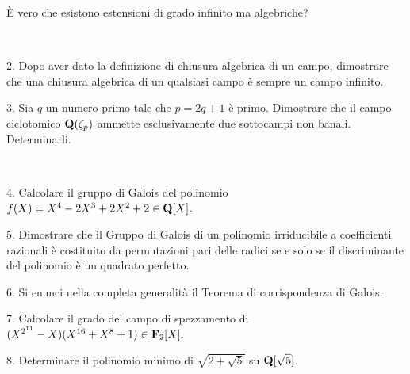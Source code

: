  \`E vero che esistono estensioni di grado infinito ma algebriche?\medskip\bigskip\bigskip

\ \dotfill\ \bigskip\bigskip\bigskip


\vfil\eject


\item{2.} Dopo aver dato la definizione di chiusura algebrica di un campo, dimostrare che una chiusura 
algebrica di un qualsiasi campo \`e sempre un campo infinito.

\vv


\item{3.} Sia $q$ un numero primo tale che $p=2q+1$ \`e  primo. Dimostrare che il campo ciclotomico
${\bf Q}(\zeta_p)$ ammette esclusivamente due sottocampi non banali. Determinarli.

\ve\ \vs


\item{4.} Calcolare il gruppo di Galois del polinomio $f(X)=X^4-2X^3+2X^2+2 \in{\bf Q}[X]$. \vv

\item{5.} Dimostrare che il Gruppo di Galois di un polinomio irriducibile a coefficienti razionali \`e 
costituito da permutazioni pari delle radici se e solo se il discriminante del polinomio \`e un
quadrato perfetto.
\ve\ \vs


\item{6.} Si enunci nella completa generalit\`a il Teorema di
corrispondenza di Galois.\vv\vv


\item{7.} Calcolare il grado del campo di spezzamento di 
$(X^{2^{11}}-X)(X^{16}+X^8+1)\in{\bf F}_2[X].$\vv\vv

\item{8.} Determinare il polinomio minimo di $\sqrt{2+\sqrt{5}}$ su ${\bf Q}[\sqrt{5}]$.


\vv



\ \vst
 \bye
